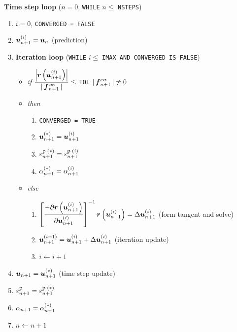 \begin{hboxfloat*}
 \caption{Predictor/corrector time stepping algorithm 
 applied to elasto-plastic equations of motion.}
 \label{box:defimp}
\normalsize 
\begin{center}
{\bf Time step loop} ($n=0$, {\tt WHILE} $n \leq $ {\tt NSTEPS})
\begin{enumerate}
 	\item $i=0$, {\tt CONVERGED = FALSE} 
	\item $\mbox{\boldmath $u$}_{n+1}^{(i)} = \mbox{\boldmath $u$}_{n}$ (prediction)
	\vspace{0.5cm}
      \item {\bf Iteration loop} ({\tt WHILE} $i \leq \;${\tt IMAX 
      AND CONVERGED IS FALSE})
      \begin{itemize}
		\vspace{0.25cm}
		\item {\em if} \hspace{0.25cm} 
			$\displaystyle\frac{\left| \mbox{\boldmath $r$} 
			\left( \mbox{\boldmath $u$}_{n+1}^{(i)} \right) \right|}{| \, \mbox{\boldmath $f$}^{\mbox{\tiny ext}}_{n+1} \, |}  
			\leq$ {\tt TOL}
			\hspace{0.25cm} $| \, \mbox{\boldmath $f$}^{\mbox{\tiny ext}}_{n+1} \, | \neq 0$
		\vspace{0.125cm}
		\item {\em then}
		\begin{enumerate}
			\item {\tt CONVERGED = TRUE}
			\item $\mbox{\boldmath $u$}_{n+1}^{(*)} = \mbox{\boldmath $u$}_{n+1}^{(i)}$
			\item $\varepsilon_{n+1}^{\mbox{\footnotesize p}\;(*)} 
			      = \varepsilon^{\mbox{\footnotesize p}\;(i)}_{n+1}$
			\item $\alpha_{n+1}^{(*)} = \alpha_{n+1}^{(i)}$
		\end{enumerate}
		\item {\em else}
		\vspace{0.25cm}
		\begin{enumerate}
			\item $\left[ 
			\displaystyle\frac{-\partial 
			\mbox{\boldmath $r$} \left(\mbox{\boldmath $u$}_{n+1}^{(i)} \right)}{\partial \mbox{\boldmath $u$}_{n+1}^{(i)}} 
			\right]^{-1} \mbox{\boldmath $r$} \left( \mbox{\boldmath $u$}_{n+1}^{(i)} \right) 
			= \Delta \mbox{\boldmath $u$}_{n+1}^{(i)}$ (form tangent and solve)
		\vspace{0.25cm}
			\item $\mbox{\boldmath $u$}_{n+1}^{(i+1)} = \mbox{\boldmath $u$}_{n+1}^{(i)} 
			+ \Delta \mbox{\boldmath $u$}_{n+1}^{(i)}$ (iteration update)
			\item $i \leftarrow i+1$
		\end{enumerate}
	\end{itemize}
	\vspace{0.5cm}
      \item $\mbox{\boldmath $u$}_{n+1} = \mbox{\boldmath $u$}_{n+1}^{(*)}$ (time step update)
      \item $\varepsilon^{\mbox{\footnotesize p}}_{n+1} = \varepsilon_{n+1}^{\mbox{\footnotesize p}\;(*)}$
      \item $\alpha_{n+1} = \alpha_{n+1}^{(*)}$
      \item $n \leftarrow n+1$
      \end{enumerate}  
\end{center}
\end{hboxfloat*}











  














